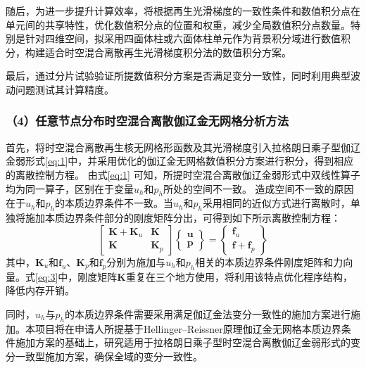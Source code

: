 随后，为进一步提升计算效率，将根据再生光滑梯度的一致性条件和数值积分点在单元间的共享特性，优化数值积分点的位置和权重，减少全局数值积分点数量。特别是针对四维空间，拟采用四面体柱或六面体柱单元作为背景积分域进行数值积分，构建适合时空混合离散再生光滑梯度积分法的数值积分方案。

    

最后，通过分片试验验证所提数值积分方案是否满足变分一致性，同时利用典型波动问题测试其计算精度。

\subsubsection*{\bfseries （4）任意节点分布时空混合离散伽辽金无网格分析方法}
首先，将时空混合离散再生核无网格形函数及其光滑梯度引入拉格朗日乘子型伽辽金弱形式\eqref{eq:1}中，并采用优化的伽辽金无网格数值积分方案进行积分，得到相应的离散控制方程。
由式\eqref{eq:1} 可知，所提时空混合离散伽辽金弱形式中双线性算子均为同一算子，区别在于变量$u_h$和$p_h$所处的空间不一致。
造成空间不一致的原因在于$u_h$和$p_h$的本质边界条件不一致。当$u_h$和$p_h$采用相同的近似方式进行离散时，单独将施加本质边界条件部分的刚度矩阵分出，可得到如下所示离散控制方程：
\begin{equation}
    \begin{bmatrix} 
        \boldsymbol K + \boldsymbol K_{u} & \boldsymbol K \\
        \boldsymbol K & \boldsymbol K_{p} 
    \end{bmatrix} 
    \begin{Bmatrix}
        \boldsymbol u \\ \boldsymbol p
    \end{Bmatrix} =
    \begin{Bmatrix} \boldsymbol f_u \\ \boldsymbol f + \boldsymbol f_p \end{Bmatrix}
    \label{eq:3} 
\end{equation}
其中，$\boldsymbol K_u$和$\boldsymbol f_u$、$\boldsymbol K_p$和$\boldsymbol f_p$分别为施加与$u_h$和$p_h$相关的本质边界条件刚度矩阵和力向量。式\eqref{eq:3}中，刚度矩阵$\boldsymbol K$重复在三个地方使用，将利用该特点优化程序结构，降低内存开销。

同时，$u_h$与$p_h$的本质边界条件需要采用满足伽辽金法变分一致性的施加方案进行施加。本项目将在申请人所提基于Hellinger--Reissner原理伽辽金无网格本质边界条件施加方案的基础上，研究适用于拉格朗日乘子型时空混合离散伽辽金弱形式的变分一致型施加方案，确保全域的变分一致性。

